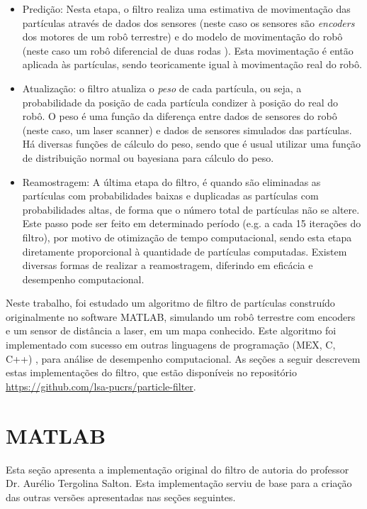 \documentclass[
	12pt,				%
	openright,			%
	oneside,			%
	a4paper,			%
	english,			%
	french,				%
	spanish,			%
	brazil,				%
	]{abntex2}
\begin{document}
\begin{itemize}
\item Predição: Nesta etapa, o filtro realiza uma estimativa de movimentação das partículas através de dados dos sensores (neste caso os sensores são \emph{encoders} dos motores de um robô terrestre) e do modelo de movimentação do robô (neste caso um robô diferencial de duas rodas \cite{NEH03,SIE04,DUD10}). Esta movimentação é então aplicada às partículas, sendo teoricamente igual à movimentação real do robô.
\item Atualização: o filtro atualiza o \emph{peso} de cada partícula, ou seja, a probabilidade da posição de cada partícula condizer à posição do real do robô. O peso é uma função da diferença entre dados de sensores do robô (neste caso, um laser scanner) e dados de sensores simulados das partículas. Há diversas funções de cálculo do peso, sendo que é usual utilizar uma função de distribuição normal ou bayesiana para cálculo do peso.
\item Reamostragem: A última etapa do filtro, é quando são eliminadas as partículas com probabilidades baixas e duplicadas as partículas com probabilidades altas, de forma que o número total de partículas não se altere. Este passo pode ser feito em determinado período (e.g. a cada 15 iterações do filtro), por motivo de otimização de tempo computacional, sendo esta etapa diretamente proporcional à quantidade de partículas computadas. Existem diversas formas de realizar a reamostragem, diferindo em eficácia e desempenho computacional.
\end{itemize}

Neste trabalho, foi estudado um algoritmo de filtro de partículas construído originalmente no software MATLAB, simulando um robô terrestre com encoders e um sensor de distância a laser, em um mapa conhecido. Este algoritmo foi implementado com sucesso em outras linguagens de programação (MEX, C, C++) , para análise de desempenho computacional. As seções a seguir descrevem estas implementações do filtro, que estão disponíveis no repositório \url{https://github.com/lsa-pucrs/particle-filter}.

\section{MATLAB\texttrademark}
\label{sec:matlab}

Esta seção apresenta a implementação original do filtro de autoria do professor Dr. Aurélio Tergolina Salton. Esta implementação serviu de base para a criação das outras versões apresentadas nas seções seguintes.
\end{document}
